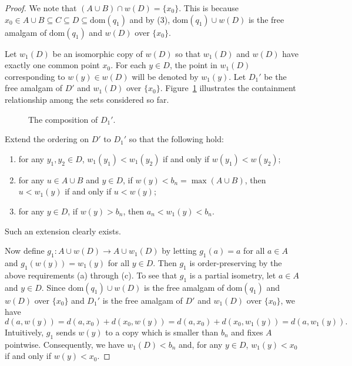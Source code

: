 \documentclass[10pt,a4paper]{amsart}
\theoremstyle{definition}
\theoremstyle{remark}
\begin{document}
\begin{proof}
We note that $(A \cup B) \cap w(D) = \{x_0\}$. This is because $x_0\in A\cup  B\subseteq C\subseteq D\subseteq \mbox{dom}(q_1)$ and by (3), $\mbox{dom}(q_1)\cup w(D)$ is the free amalgam of $\mbox{dom}(q_1)$ and $w(D)$ over $\{x_0\}$. 

Let $w_1(D)$ be an isomorphic copy of $w(D)$ so that $w_1(D)$ and $w(D)$ have exactly one common point $x_0$. For each $y\in D$, the point in $w_1(D)$ corresponding to $w(y)\in w(D)$ will be denoted by $w_1(y)$. Let $D_1'$ be the free amalgam of $D'$ and $w_1(D)$ over $\{x_0\}$. Figure~\ref{fig:1} illustrates the containment relationship among the sets considered so far. 

\begin{figure}[h]
\caption{The composition of $D_1'$. \label{fig:1}}
\end{figure}
      
Extend the ordering on $D'$ to $D_1'$ so that the following hold:
    \begin{enumerate}
       \item[(a)] for any $y_1,y_2 \in D$, $w_1(y_1) < w_1(y_2)$ if and only if $w(y_1) < w(y_2)$;
       \item[(b)] for any $u \in A \cup B$ and $y \in D$, if $w(y) < b_n=\max(A\cup B)$, then $u<w_1(y)$ if and only if $u<w(y)$;
       \item[(c)] for any $y \in D$, if $w(y) > b_n$, then $a_n < w_1(y) <b_n$. 
    \end{enumerate}
    Such an extension clearly exists. 

Now define $g_1\colon A\cup w(D)\to A\cup w_1(D)$ by letting $g_1(a) = a$ for all $a\in A$ and $g_1(w(y)) = w_1(y)$ for all $y\in D$. Then $g_1$ is order-preserving by the above requirements (a) through (c). To see that $g_1$ is a partial isometry, let $a \in A$ and $y\in D$. Since $\mbox{dom}(q_1)\cup w(D)$ is the free amalgam of $\mbox{dom}(q_1)$ and $w(D)$ over $\{x_0\}$ and $D_1'$ is the free amalgam of $D'$ and $w_1(D)$ over $\{x_0\}$, we have \[d(a, w(y))=d(a,x_0)+d(x_0,w(y))=d(a,x_0)+d(x_0,w_1(y))=d(a,w_1(y)).\] 
    Intuitively, $g_1$ sends $w(y)$ to a copy which is smaller than $b_n$ and fixes $A$ pointwise. Consequently, we have $w_1(D)<b_n$ and, for any $y \in D$, $w_1(y) <x_0$ if and only if $w(y)<x_0$.
    

\end{proof}
\end{document}
